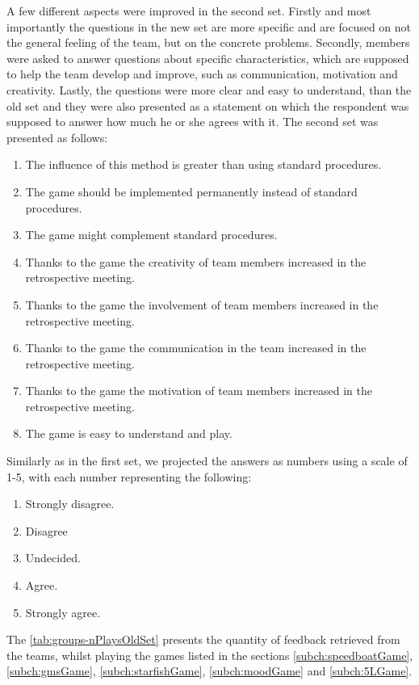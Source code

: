 A few different aspects were improved in the second set. Firstly and most importantly the questions in the new set are more specific and are focused on not the general feeling of the team, but on the concrete problems. Secondly, members were asked to answer questions about specific characteristics, which are supposed to help the team develop and improve, such as communication, motivation and creativity. Lastly, the questions were more clear and easy to understand, than the old set and they were also presented as a statement on which the respondent was supposed to answer how much he or she agrees with it.
The second set was presented as follows:
\begin{enumerate}
    \item The influence of this method is greater than using standard procedures.
    \item The game should be implemented permanently instead of standard procedures.
    \item The game might complement standard procedures.
    \item Thanks to the game the creativity of team members increased in the retrospective meeting.
    \item Thanks to the game the involvement of team members increased in the retrospective meeting.
    \item Thanks to the game the communication in the team increased in the retrospective meeting.
    \item Thanks to the game the motivation of team members increased in the retrospective meeting.
    \item The game is easy to understand and play.
\end{enumerate}
Similarly as in the first set, we projected the answers as numbers using a scale of 1-5, with each number representing the following:
\begin{enumerate}
    \item Strongly disagree.
    \item Disagree
    \item Undecided.
    \item Agree.
    \item Strongly agree.
\end{enumerate}

The \autoref{tab:groups-nPlaysOldSet} presents the quantity of feedback retrieved from the teams, whilst playing the games listed in the sections \ref{subch:speedboatGame},\ref{subch:gmsGame}, \ref{subch:starfishGame}, \ref{subch:moodGame} and \ref{subch:5LGame}.
\newline



